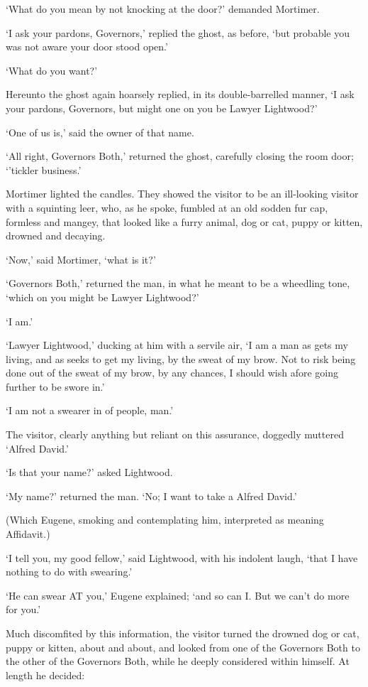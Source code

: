 ‘What do you mean by not knocking at the door?’ demanded Mortimer.

‘I ask your pardons, Governors,’ replied the ghost, as before, ‘but
probable you was not aware your door stood open.’

‘What do you want?’

Hereunto the ghost again hoarsely replied, in its double-barrelled
manner, ‘I ask your pardons, Governors, but might one on you be Lawyer
Lightwood?’

‘One of us is,’ said the owner of that name.

‘All right, Governors Both,’ returned the ghost, carefully closing the
room door; ‘’tickler business.’

Mortimer lighted the candles. They showed the visitor to be an
ill-looking visitor with a squinting leer, who, as he spoke, fumbled
at an old sodden fur cap, formless and mangey, that looked like a furry
animal, dog or cat, puppy or kitten, drowned and decaying.

‘Now,’ said Mortimer, ‘what is it?’

‘Governors Both,’ returned the man, in what he meant to be a wheedling
tone, ‘which on you might be Lawyer Lightwood?’

‘I am.’

‘Lawyer Lightwood,’ ducking at him with a servile air, ‘I am a man as
gets my living, and as seeks to get my living, by the sweat of my brow.
Not to risk being done out of the sweat of my brow, by any chances, I
should wish afore going further to be swore in.’

‘I am not a swearer in of people, man.’

The visitor, clearly anything but reliant on this assurance, doggedly
muttered ‘Alfred David.’

‘Is that your name?’ asked Lightwood.

‘My name?’ returned the man. ‘No; I want to take a Alfred David.’

(Which Eugene, smoking and contemplating him, interpreted as meaning
Affidavit.)

‘I tell you, my good fellow,’ said Lightwood, with his indolent laugh,
‘that I have nothing to do with swearing.’

‘He can swear AT you,’ Eugene explained; ‘and so can I. But we can’t do
more for you.’

Much discomfited by this information, the visitor turned the drowned
dog or cat, puppy or kitten, about and about, and looked from one of
the Governors Both to the other of the Governors Both, while he deeply
considered within himself. At length he decided:

